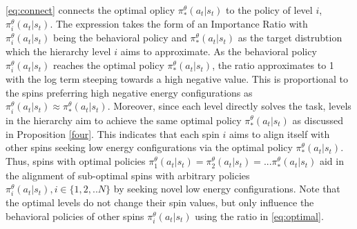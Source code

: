 \documentclass{article}
\begin{document}
\autoref{eq:connect} connects the optimal oplicy $\pi^{\theta}_{*}(a_{t}|s_{t})$ to the policy of level $i$, $\pi^{\theta}_{i}(a_{t}|s_{t})$. The expression takes the form of an Importance Ratio \cite{sutton,ppo} with $\pi^{\theta}_{i}(a_{t}|s_{t})$ being the behavioral policy and $\pi^{\theta}_{*}(a_{t}|s_{t})$ as the target distrubtion which the hierarchy level $i$ aims to approximate. As the behavioral policy $\pi^{\theta}_{i}(a_{t}|s_{t})$ reaches the optimal policy $\pi^{\theta}_{*}(a_{t}|s_{t})$, the ratio approximates to 1 with the log term steeping towards a high negative value. This is proportional to the spins preferring high negative energy configurations as $\pi^{\theta}_{i}(a_{t}|s_{t}) \approx \pi^{\theta}_{*}(a_{t}|s_{t})$. Moreover, since each level directly solves the task, levels in the hierarchy aim to achieve the same optimal policy $\pi^{\theta}_{*}(a_{t}|s_{t})$ as discussed in Proposition \autoref{four}. This indicates that each spin $i$ aims to align itself with other spins seeking low energy configurations via the optimal policy $\pi^{\theta}_{*}(a_{t}|s_{t})$. Thus, spins with optimal policies $\pi^{\theta}_{1}(a_{t}|s_{t}) = \pi^{\theta}_{2}(a_{t}|s_{t}) = ...\pi^{\theta}_{*}(a_{t}|s_{t})$ aid in the alignment of sub-optimal spins with arbitrary policies $\pi^{\theta}_{i}(a_{t}|s_{t}), i \in \{1,2,..N\}$ by seeking novel low energy configurations. Note that the optimal levels do not change their spin values, but only influence the behavioral policies of other spins $\pi^{\theta}_{i}(a_{t}|s_{t})$ using the ratio in \autoref{eq:optimal}. 


 

\end{document}
